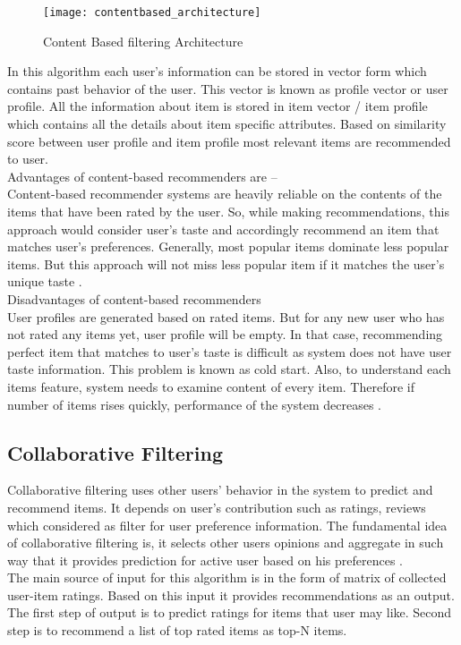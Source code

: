 \begin{figure}[H]
	\centering
	\texttt{[image: contentbased\_architecture]}
	\caption{Content Based filtering Architecture \cite{5}}
	\label{fig:contentbased_architecture}
\end{figure}

\noindent In this algorithm each user's information can be stored in vector form which contains past behavior of the user. This vector is known as profile vector or user profile. All the information about item is stored in item vector / item profile which contains all the details about item specific attributes. Based on similarity score between user profile and item profile most relevant items are recommended to user. 
\\
Advantages of content-based recommenders are – 
\\
Content-based recommender systems are heavily reliable on the contents of the items that have been rated by the user. So, while making recommendations, this approach would consider user’s taste and accordingly recommend an item that matches user’s preferences. Generally, most popular items dominate less popular items. But this approach will not miss less popular item if it matches the user’s unique taste \cite{6}.
\\
Disadvantages of content-based recommenders
\\
User profiles are generated based on rated items. But for any new user who has not rated any items yet, user profile will be empty. In that case, recommending perfect item that matches to user’s taste is difficult as system does not have user taste information. This problem is known as cold start. Also, to understand each items feature, system needs to examine content of every item. Therefore if number of items rises quickly, performance of the system decreases \cite{6}.  
\\

\subsection{Collaborative Filtering}
Collaborative filtering uses other users’ behavior in the system to predict and recommend items. It depends on user’s contribution such as ratings, reviews which considered as filter for user preference information. The fundamental idea of collaborative filtering is, it selects other users opinions and aggregate in such way that it provides prediction for active user based on his preferences \cite{7}. 
\\The main source of input for this algorithm is in the form of matrix of collected user-item ratings. Based on this input it provides recommendations as an output. The first step of output is to predict ratings for items that user may like. Second step is to recommend a list of top rated items as top-N items.
\\

